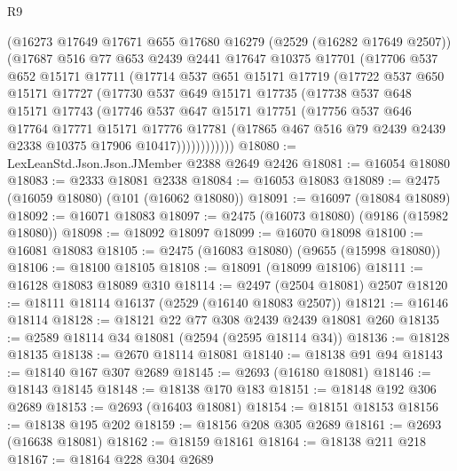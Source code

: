 \begin{lexlean}{R9}
\begin{coremodule}
        (@16273
          @17649
          @17671
          @655
          @17680
          @16279
          (@2529 (@16282 @17649 @2507))
          (@17687
            @516
            @77
            @653
            @2439
            @2441
            @17647
            @10375
            @17701
            (@17706
              @537
              @652
              @15171
              @17711
              (@17714
                @537
                @651
                @15171
                @17719
                (@17722
                  @537
                  @650
                  @15171
                  @17727
                  (@17730
                    @537
                    @649
                    @15171
                    @17735
                    (@17738
                      @537
                      @648
                      @15171
                      @17743
                      (@17746
                        @537
                        @647
                        @15171
                        @17751
                        (@17756
                          @537
                          @646
                          @17764
                          @17771
                          @15171
                          @17776
                          @17781
                          (@17865 @467 @516 @79 @2439 @2439 @2338 @10375 @17906 @10417))))))))))))
@18080 := LexLeanStd.Json.Json.JMember @2388 @2649 @2426
@18081 := @16054 @18080
@18083 := @2333 @18081 @2338
@18084 := @16053 @18083
@18089 := @2475 (@16059 @18080) (@101 (@16062 @18080))
@18091 := @16097 (@18084 @18089)
@18092 := @16071 @18083
@18097 := @2475 (@16073 @18080) (@9186 (@15982 @18080))
@18098 := @18092 @18097
@18099 := @16070 @18098
@18100 := @16081 @18083
@18105 := @2475 (@16083 @18080) (@9655 (@15998 @18080))
@18106 := @18100 @18105
@18108 := @18091 (@18099 @18106)
@18111 := @16128 @18083 @18089 @310
@18114 := @2497 (@2504 @18081) @2507
@18120 := @18111 @18114 @16137 (@2529 (@16140 @18083 @2507))
@18121 := @16146 @18114
@18128 := @18121 @22 @77 @308 @2439 @2439 @18081 @260
@18135 := @2589 @18114 @34 @18081 (@2594 (@2595 @18114 @34))
@18136 := @18128 @18135
@18138 := @2670 @18114 @18081
@18140 := @18138 @91 @94
@18143 := @18140 @167 @307 @2689
@18145 := @2693 (@16180 @18081)
@18146 := @18143 @18145
@18148 := @18138 @170 @183
@18151 := @18148 @192 @306 @2689
@18153 := @2693 (@16403 @18081)
@18154 := @18151 @18153
@18156 := @18138 @195 @202
@18159 := @18156 @208 @305 @2689
@18161 := @2693 (@16638 @18081)
@18162 := @18159 @18161
@18164 := @18138 @211 @218
@18167 := @18164 @228 @304 @2689

\end{coremodule}
\end{lexlean}
